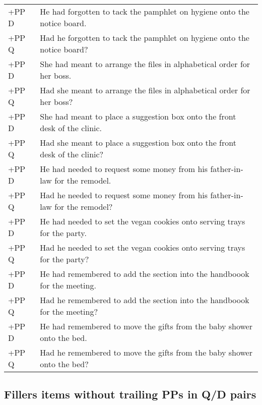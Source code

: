 \documentclass[11pt,oneside]{book}
\begin{document}
\begin{longtable}{ll}
\addlinespace
+PP D & He had forgotten to tack the pamphlet on hygiene onto the notice board.\\
+PP Q & Had he forgotten to tack the pamphlet on hygiene onto the notice board?\\
\addlinespace
+PP D & She had meant to arrange the files in alphabetical order for her boss.\\
+PP Q & Had she meant to arrange the files in alphabetical order for her boss?\\
\addlinespace
+PP D & She had meant to place a suggestion box onto the front desk of the clinic.\\
+PP Q & Had she meant to place a suggestion box onto the front desk of the clinic?\\
\addlinespace
+PP D & He had needed to request some money from his father-in-law for the remodel.\\
+PP Q & Had he needed to request some money from his father-in-law for the remodel?\\
\addlinespace
+PP D & He had needed to set the vegan cookies onto serving trays for the party.\\
+PP Q & Had he needed to set the vegan cookies onto serving trays for the party?\\
\addlinespace
+PP D & He had remembered to add the section into the handboook for the meeting.\\
+PP Q & Had he remembered to add the section into the handboook for the meeting?\\
\addlinespace
+PP D & He had remembered to move the gifts from the baby shower onto the bed.\\
+PP Q & Had he remembered to move the gifts from the baby shower onto the bed?\\*
\end{longtable}

\newpage

\hypertarget{fillers-items-without-trailing-pps-in-qd-pairs}{%
\subsection*{Fillers items without trailing PPs in Q/D pairs}\label{fillers-items-without-trailing-pps-in-qd-pairs}}
\end{document}
